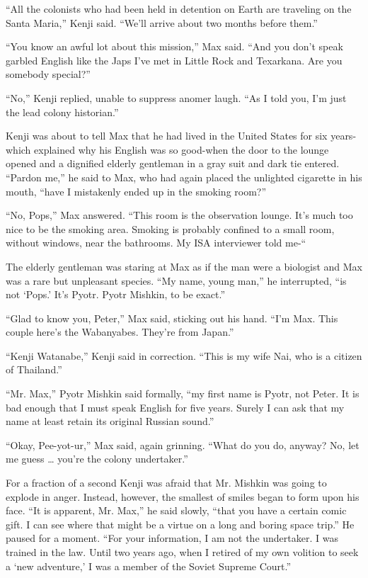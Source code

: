 \documentclass[]{article}
\begin{document}
{“All the colonists who had been held in detention on Earth are traveling on the Santa Maria,” Kenji said. “We’ll arrive about two months before them.”

“You know an awful lot about this mission,” Max said. “And you don’t speak garbled English like the Japs I’ve met in Little Rock and Texarkana. Are you somebody special?”

“No,” Kenji replied, unable to suppress anomer laugh. “As I told you, I’m just the lead colony historian.”

Kenji was about to tell Max that he had lived in the United States for six years-which explained why his English was so good-when the door to the lounge opened and a dignified elderly gentleman in a gray suit and dark tie entered. “Pardon me,” he said to Max, who had again placed the unlighted cigarette in his mouth, “have I mistakenly ended up in the smoking room?”

“No, Pops,” Max answered. “This room is the observation lounge. It’s much too nice to be the smoking area. Smoking is probably confined to a small room, without windows, near the bathrooms. My ISA interviewer told me-“

The elderly gentleman was staring at Max as if the man were a biologist and Max was a rare but unpleasant species. “My name, young man,” he interrupted, “is not ‘Pops.’ It’s Pyotr. Pyotr Mishkin, to be exact.”

“Glad to know you, Peter,” Max said, sticking out his hand. “I’m Max. This couple here’s the Wabanyabes. They’re from Japan.”

“Kenji Watanabe,” Kenji said in correction. “This is my wife Nai, who is a citizen of Thailand.”

“Mr. Max,” Pyotr Mishkin said formally, “my first name is Pyotr, not Peter. It is bad enough that I must speak English for five years. Surely I can ask that my name at least retain its original Russian sound.”

“Okay, Pee-yot-ur,” Max said, again grinning. “What do you do, anyway? No, let me guess … you’re the colony undertaker.”

For a fraction of a second Kenji was afraid that Mr. Mishkin was going to explode in anger. Instead, however, the smallest of smiles began to form upon his face. “It is apparent, Mr. Max,” he said slowly, “that you have a certain comic gift. I can see where that might be a virtue on a long and boring space trip.” He paused for a moment. “For your information, I am not the undertaker. I was trained in the law. Until two years ago, when I retired of my own volition to seek a ‘new adventure,’ I was a member of the Soviet Supreme Court.”

}
\end{document}
